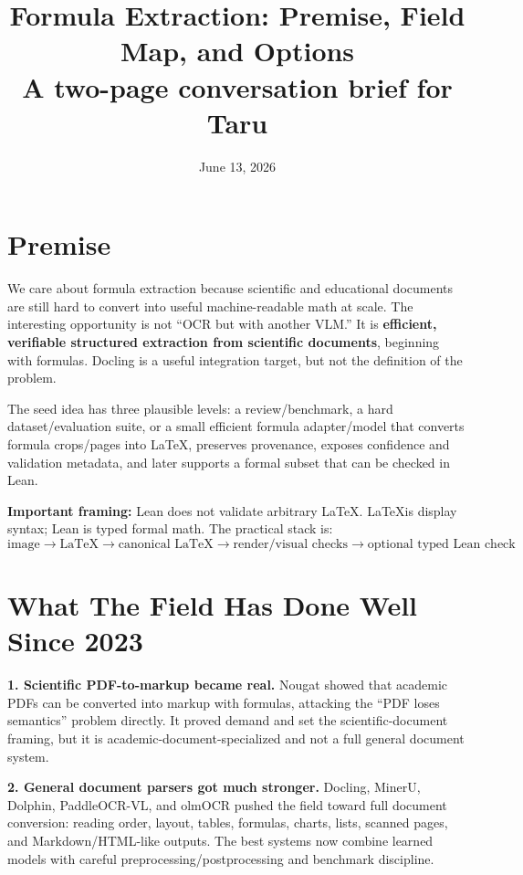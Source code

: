 \documentclass[10pt]{article}
\title{\vspace{-1.2em}\textbf{Formula Extraction: Premise, Field Map, and Options}\\[-0.2em]
\large A two-page conversation brief for Taru}
\author{}
\date{\vspace{-1.6em}June 13, 2026}
\begin{document}
\maketitle
\vspace{-1.5em}

\section{Premise}

We care about formula extraction because scientific and educational documents are still hard to convert into useful machine-readable math at scale. The interesting opportunity is not ``OCR but with another VLM.'' It is \textbf{efficient, verifiable structured extraction from scientific documents}, beginning with formulas. Docling is a useful integration target, but not the definition of the problem.

The seed idea has three plausible levels: a review/benchmark, a hard dataset/evaluation suite, or a small efficient formula adapter/model that converts formula crops/pages into \LaTeX, preserves provenance, exposes confidence and validation metadata, and later supports a formal subset that can be checked in Lean.

\textbf{Important framing:} Lean does not validate arbitrary \LaTeX. \LaTeX is display syntax; Lean is typed formal math. The practical stack is:
\[
\text{image} \rightarrow \text{LaTeX} \rightarrow \text{canonical LaTeX} \rightarrow \text{render/visual checks} \rightarrow \text{optional typed Lean check}
\]

\section{What The Field Has Done Well Since 2023}

\textbf{1. Scientific PDF-to-markup became real.} Nougat showed that academic PDFs can be converted into markup with formulas, attacking the ``PDF loses semantics'' problem directly. It proved demand and set the scientific-document framing, but it is academic-document-specialized and not a full general document system.

\textbf{2. General document parsers got much stronger.} Docling, MinerU, Dolphin, PaddleOCR-VL, and olmOCR pushed the field toward full document conversion: reading order, layout, tables, formulas, charts, lists, scanned pages, and Markdown/HTML-like outputs. The best systems now combine learned models with careful preprocessing/postprocessing and benchmark discipline.
\end{document}
